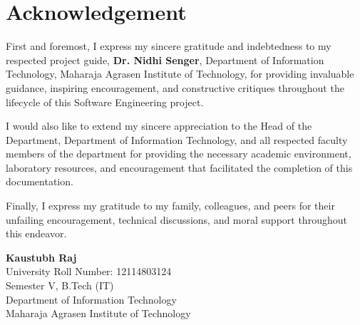 \chapter*{Acknowledgement}
\thispagestyle{empty}

First and foremost, I express my sincere gratitude and indebtedness to my respected project guide, \textbf{Dr. Nidhi Senger}, Department of Information Technology, Maharaja Agrasen Institute of Technology, for providing invaluable guidance, inspiring encouragement, and constructive critiques throughout the lifecycle of this Software Engineering project.

I would also like to extend my sincere appreciation to the Head of the Department, Department of Information Technology, and all respected faculty members of the department for providing the necessary academic environment, laboratory resources, and encouragement that facilitated the completion of this documentation.

Finally, I express my gratitude to my family, colleagues, and peers for their unfailing encouragement, technical discussions, and moral support throughout this endeavor.

\vspace{2.0cm}

\noindent
\begin{flushright}
    \textbf{Kaustubh Raj}\\
    University Roll Number: 12114803124\\
    Semester V, B.Tech (IT)\\
    Department of Information Technology\\
    Maharaja Agrasen Institute of Technology
\end{flushright}
